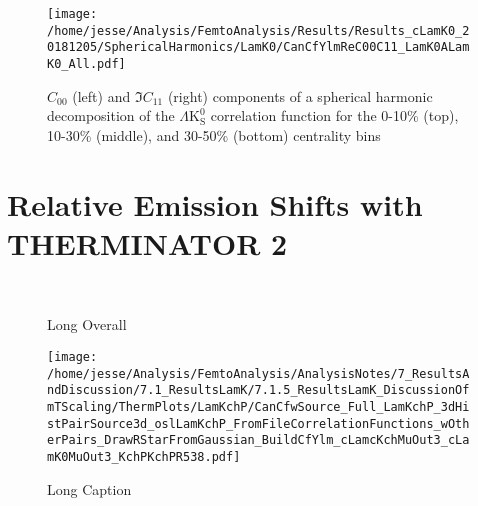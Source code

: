 \documentclass[ALICE,manyauthors]{cernphprep}
\newcommand{\LamKs}{$\Lambda\mathrm{K^{0}_{S}}$\xspace}
\begin{document}
\begin{figure}[h]
  \centering
  \texttt{[image: /home/jesse/Analysis/FemtoAnalysis/Results/Results\_cLamK0\_20181205/SphericalHarmonics/LamK0/CanCfYlmReC00C11\_LamK0ALamK0\_All.pdf]}
  \caption[\LamKs $C_{00}$ and $\Im C_{11}$ Spherical Harmonic Components]{$C_{00}$ (left) and $\Im C_{11}$ (right) components of a spherical harmonic decomposition of the \LamKs correlation function for the 0-10\% (top), 10-30\% (middle), and 30-50\% (bottom) centrality bins}
  \label{fig:LamK0_ReC00C11_All}
\end{figure}



\section{Relative Emission Shifts with THERMINATOR 2}
\label{app:SphericalHarmonics}


\begin{figure}[h!]
  \centering
   \\
  \caption[Short Overall]{Long Overall}
  \label{fig:LamKchP_StdThermSources}
\end{figure}





\begin{figure}[h]
  \centering
  \texttt{[image: /home/jesse/Analysis/FemtoAnalysis/AnalysisNotes/7\_ResultsAndDiscussion/7.1\_ResultsLamK/7.1.5\_ResultsLamK\_DiscussionOfmTScaling/ThermPlots/LamKchP/CanCfwSource\_Full\_LamKchP\_3dHistPairSource3d\_oslLamKchP\_FromFileCorrelationFunctions\_wOtherPairs\_DrawRStarFromGaussian\_BuildCfYlm\_cLamcKchMuOut3\_cLamK0MuOut3\_KchPKchPR538.pdf]}
  \caption[Short Caption]{Long Caption}
  \label{fig:LamKchP_ThermSources_GaussianSourceEx}
\end{figure}
\end{document}
